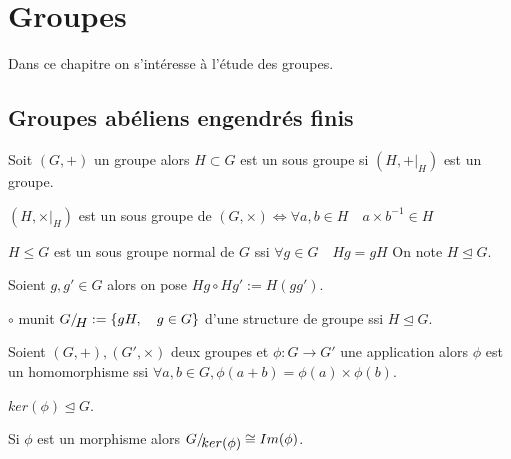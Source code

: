 \chapter{Groupes}
\label{cha:groupes}

Dans ce chapitre on s'intéresse à l'étude des groupes.

\section{Groupes abéliens engendrés finis}

 \begin{definition}
    \label{def:49}
    Soit $(G,+)$ un groupe alors $H\subset G$ est un sous groupe si $(H,+|_{ H })$ est un groupe.
 \end{definition}
 
 \begin{lemma}
    \label{lem:23}
    $(H,\times|_H)$ est un sous groupe de $(G,\times) \Leftrightarrow \forall a,b \in H\quad a\times b^{-1} \in H$
   \end{lemma}
   
    \begin{definition}
    \label{def:49}
    $H\le G$ est un sous groupe normal de $G$ ssi $\forall g \in G\quad Hg=gH$ On note $H\unlhd G$.
     \end{definition}
     
      \begin{definition}
    \label{def:49}
    Soient $g,g' \in G$ alors on pose $Hg \circ Hg' := H(gg')$.
     \end{definition}
     
     \begin{theorem}
    \label{thr:28}
    $\circ$  munit $G/\!\raisebox{-.65ex}{\ensuremath{{H}}}  := \left\{ gH,\quad g\in G \right\}$ d'une structure de groupe ssi $H\unlhd G$.
    \end{theorem}
    
       \begin{definition}
    \label{def:49}
    Soient $(G,+),(G',\times)$ deux groupes et $\phi :G\rightarrow G'$ une application alors $\phi$ est un homomorphisme ssi 
    $\forall a,b \in G, \phi(a+b)=\phi(a) \times \phi(b)$.
    \end{definition}
    
    \begin{remark}
    $ker(\phi) \unlhd G$.
    \end{remark}
    
     \begin{theorem}
    \label{thr:28}
    Si $\phi$ est un morphisme alors $G/\!\raisebox{-.65ex}{\ensuremath{{ker(\phi)}}} \cong Im(\phi)$.
     \end{theorem}
     
